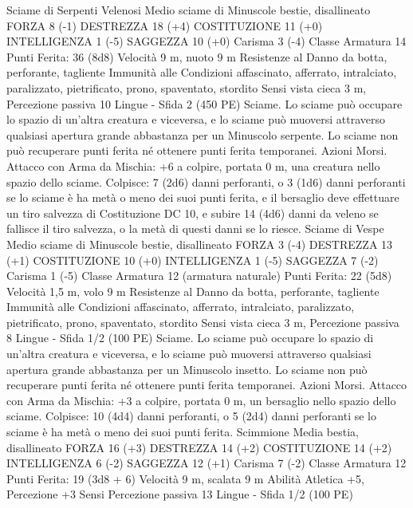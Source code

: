 \begin{multicols}{2}
Sciame di Serpenti Velenosi
Medio sciame di Minuscole bestie, disallineato
FORZA 8 (-1)
DESTREZZA 18 (+4)
COSTITUZIONE 11 (+0)
INTELLIGENZA 1 (-5)
SAGGEZZA 10 (+0)
Carisma 3 (-4)
Classe Armatura 14
\hspace*{0pt}\hfill{Punti Ferita}: 36 (8d8)
Velocità 9 m, nuoto 9 m
Resistenze al Danno da botta, perforante, tagliente
Immunità alle Condizioni affascinato, afferrato, intralciato,
paralizzato, pietrificato, prono, spaventato, stordito
Sensi vista cieca 3 m, Percezione passiva 10
Lingue -
Sfida 2 (450 PE)
Sciame. Lo sciame può occupare lo spazio di un’altra creatura e
viceversa, e lo sciame può muoversi attraverso qualsiasi apertura
grande abbastanza per un Minuscolo serpente. Lo sciame non
può recuperare punti ferita né ottenere punti ferita temporanei.
Azioni
Morsi. Attacco con Arma da Mischia: +6 a colpire, portata 0 m,
una creatura nello spazio dello sciame.
Colpisce: 7 (2d6) danni perforanti, o 3 (1d6) danni perforanti se
lo sciame è ha metà o meno dei suoi punti ferita, e il bersaglio
deve effettuare un tiro salvezza di Costituzione DC 10, e subire
14 (4d6) danni da veleno se fallisce il tiro salvezza, o la metà di
questi danni se lo riesce.
Sciame di Vespe
Medio sciame di Minuscole bestie, disallineato
FORZA 3 (-4)
DESTREZZA 13 (+1)
COSTITUZIONE 10 (+0)
INTELLIGENZA 1 (-5)
SAGGEZZA 7 (-2)
Carisma 1 (-5)
Classe Armatura 12 (armatura naturale)
\hspace*{0pt}\hfill{Punti Ferita}: 22 (5d8)
Velocità 1,5 m, volo 9 m
Resistenze al Danno da botta, perforante, tagliente
Immunità alle Condizioni affascinato, afferrato, intralciato,
paralizzato, pietrificato, prono, spaventato, stordito
Sensi vista cieca 3 m, Percezione passiva 8
Lingue -
Sfida 1/2 (100 PE)
Sciame. Lo sciame può occupare lo spazio di un’altra creatura e
viceversa, e lo sciame può muoversi attraverso qualsiasi apertura
grande abbastanza per un Minuscolo insetto. Lo sciame non può
recuperare punti ferita né ottenere punti ferita temporanei.
Azioni
Morsi. Attacco con Arma da Mischia: +3 a colpire, portata 0 m,
un bersaglio nello spazio dello sciame.
Colpisce: 10 (4d4) danni perforanti, o 5 (2d4) danni perforanti se
lo sciame è ha metà o meno dei suoi punti ferita.
Scimmione
Media bestia, disallineato
FORZA 16 (+3)
DESTREZZA 14 (+2)
COSTITUZIONE 14 (+2)
INTELLIGENZA 6 (-2)
SAGGEZZA 12 (+1)
Carisma 7 (-2)
Classe Armatura 12
\hspace*{0pt}\hfill{Punti Ferita}: 19 (3d8 + 6)
Velocità 9 m, scalata 9 m
Abilità Atletica +5, Percezione +3
Sensi Percezione passiva 13
Lingue -
Sfida 1/2 (100 PE)

\end{multicols}
